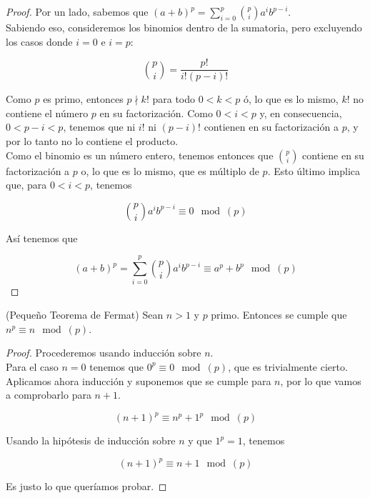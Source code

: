 \begin{proof}
	Por un lado, sabemos que $(a + b)^p = \sum_{i=0}^{p}\binom{p}{i}a^ib^{p-i}$.\\
	
	Sabiendo eso, consideremos los binomios dentro de la sumatoria, pero excluyendo los casos donde $i = 0$ e $i = p$:
	
	\[ \binom{p}{i} = \frac{p!}{i!(p - i)!} \]
	
	Como $p$ es primo, entonces $p \nmid k!$ para todo $0 < k < p$ ó, lo que es lo mismo, $k!$ no contiene el número $p$ en su factorización. Como $0 < i < p$ y, en consecuencia, $0 < p - i < p$, tenemos que ni $i!$ ni $(p - i)!$ contienen en su factorización a $p$, y por lo tanto no lo contiene el producto.\\
	
	Como el binomio es un número entero, tenemos entonces que $\binom{p}{i}$ contiene en su factorización a $p$ o, lo que es lo mismo, que es múltiplo de $p$. Esto último implica que, para $0 < i < p$, tenemos
	
	\[ \binom{p}{i}a^ib^{p-i} \equiv 0 \mod(p) \]
	
	Así tenemos que
	
	\[ (a + b)^p = \sum_{i=0}^{p}\binom{p}{i}a^ib^{p-i} \equiv a^p + b^p \mod(p) \]
\end{proof}

\begin{teorema}{(Pequeño Teorema de Fermat)}\label{pequenio_teorema_de_fermat}
	Sean $n > 1$ y $p$ primo. Entonces se cumple que $n^p \equiv n \mod(p)$.
\end{teorema}

\begin{proof}
	Procederemos usando inducción sobre $n$.\\
	
	Para el caso $n = 0$ tenemos que $0^p \equiv 0 \mod(p)$, que es trivialmente cierto.\\
	
	Aplicamos ahora inducción y suponemos que se cumple para $n$, por lo que vamos a comprobarlo para $n + 1$.
	
	\[ (n + 1)^p \equiv n^p + 1^p \mod(p) \]
	
	Usando la hipótesis de inducción sobre $n$ y que $1^p = 1$, tenemos
	
	\[ (n + 1)^p \equiv n + 1 \mod(p) \]
	
	Es justo lo que queríamos probar.
\end{proof}

